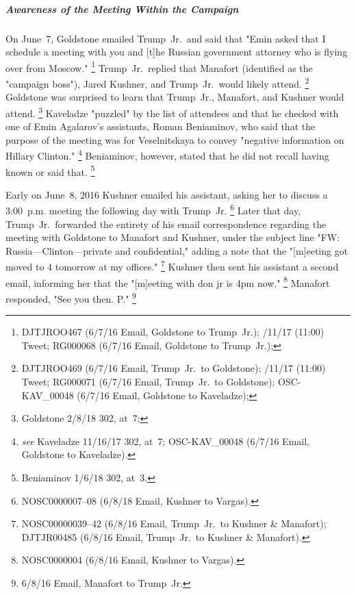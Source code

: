 \subparagraph{Awareness of the Meeting Within the Campaign}

On June~7, Goldstone emailed Trump~Jr.\ and said that "Emin asked that I schedule a meeting with you and [t]he Russian government attorney who is flying over from Moscow."%
\footnote{DJTJROO467 (6/7/16 Email, Goldstone to Trump~Jr.);
/11/17 (11:00) Tweet;
RG000068 (6/7/16 Email, Goldstone to Trump~Jr.);
}
Trump~Jr.\ replied that Manafort (identified as the "campaign boss"), Jared Kushner, and Trump~Jr.\ would likely attend.%
\footnote{DJTJROO469 (6/7/16 Email, Trump~Jr.\ to Goldstone);
/11/17 (11:00) Tweet;
RG000071 (6/7/16 Email, Trump~Jr.\ to Goldstone);
OSC-KAV\_00048 (6/7/16 Email, Goldstone to Kaveladze);
}
Goldstone was surprised to learn that Trump~Jr., Manafort, and Kushner would attend.%
\footnote{Goldstone 2/8/18 302, at~7;
}
Kaveladze 
"puzzled" by the list of attendees and that he checked with one of Emin Agalarov's assistants, Roman Beniaminov, who said that the purpose of the meeting was for Veselnitskaya to convey "negative information on Hillary Clinton."%
\footnote{ \textit{see} Kaveladze 11/16/17 302, at~7;
OSC-KAV\_00048 (6/7/16 Email, Goldstone to Kaveladze).}
Beniaminov, however, stated that he did not recall having known or said that.%
\footnote{Beniaminov 1/6/18 302, at~3.}

Early on June~8, 2016 Kushner emailed his assistant, asking her to discuss a 3:00~p.m. meeting the following day with Trump~Jr.%
\footnote{NOSC0000007--08 (6/8/18 Email, Kushner to Vargas).}
Later that day, Trump~Jr.\ forwarded the entirety of his email correspondence regarding the meeting with Goldstone to Manafort and Kushner, under the subject line "FW: Russia---Clinton---private and confidential," adding a note that the "[m]eeting got moved to 4 tomorrow at my offices."%
\footnote{NOSC00000039--42 (6/8/16 Email, Trump~Jr.\ to Kushner \& Manafort);
DJTJR00485 (6/8/16 Email, Trump~Jr.\ to Kushner \& Manafort).}
Kushner then sent his assistant a second email, informing her that the "[m]eeting with don jr is 4pm now."%
\footnote{NOSC0000004 (6/8/16 Email, Kushner to Vargas).}
Manafort responded, "See you then. P."%
\footnote{6/8/16 Email, Manafort to Trump~Jr.}

